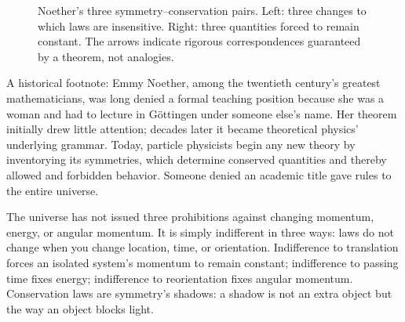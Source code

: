 \begin{figure}[htbp]
\centering
{}
\caption{Noether's three symmetry--conservation pairs. Left: three changes to which laws are insensitive. Right: three quantities forced to remain constant. The arrows indicate rigorous correspondences guaranteed by a theorem, not analogies.}
\end{figure}

A historical footnote: Emmy Noether, among the twentieth century's greatest mathematicians, was long denied a formal teaching position because she was a woman and had to lecture in G\"ottingen under someone else's name. Her theorem initially drew little attention; decades later it became theoretical physics' underlying grammar. Today, particle physicists begin any new theory by inventorying its symmetries, which determine conserved quantities and thereby allowed and forbidden behavior. Someone denied an academic title gave rules to the entire universe.


\begin{oneline}
The universe has not issued three prohibitions against changing momentum, energy, or angular momentum. It is simply indifferent in three ways: laws do not change when you change location, time, or orientation. Indifference to translation forces an isolated system's momentum to remain constant; indifference to passing time fixes energy; indifference to reorientation fixes angular momentum. Conservation laws are symmetry's shadows: a shadow is not an extra object but the way an object blocks light.
\end{oneline}

